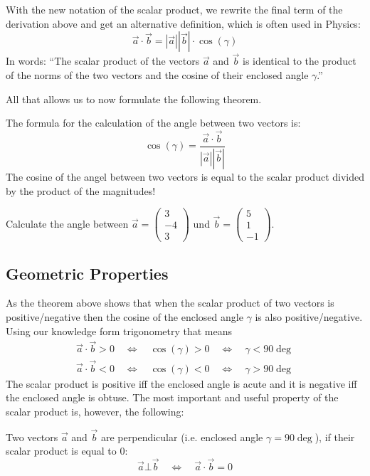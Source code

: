 \documentclass[12pt,eng]{skript_ogg}
\begin{document}
With the new notation of the scalar product, we rewrite the final term of the derivation above and get an alternative definition, which is often used in Physics:
\[\vec{a}\cdot\vec{b}=|\vec{a}||\vec{b}|\cdot\cos(\gamma)\]
In words: ``The scalar product of the vectors $\vec{a}$ and $\vec{b}$ is identical to the product of the norms of the two vectors and the cosine of their enclosed angle $\gamma$.''

All that allows us to now formulate the following theorem.

\begin{satz}
The formula for the calculation of the angle between two vectors is:
\[\cos(\gamma)=\frac{\vec{a}\cdot\vec{b}}{|\vec{a}||\vec{b}|}\]
The cosine of the angel between two vectors is equal to the scalar product divided by the product of the magnitudes!
\end{satz}

\begin{uebung} Calculate the angle between
$\vec{a}=\begin{pmatrix}3\\-4\\3
\end{pmatrix}$ und $\vec{b}=\begin{pmatrix}5\\1\\-1
\end{pmatrix}$.

\vspace{4cm}

\end{uebung}

\subsection{Geometric Properties}
As the theorem above shows that when the scalar product of two vectors is positive/negative then the cosine of the enclosed angle $\gamma$ is also positive/negative. Using our knowledge form trigonometry that means
\[\begin{array}{l}\vec{a}\cdot\vec{b}>0\quad\Leftrightarrow\quad\cos(\gamma)>0\quad\Leftrightarrow\quad\gamma<90\deg\\
\vec{a}\cdot\vec{b}<0\quad\Leftrightarrow\quad\cos(\gamma)<0\quad\Leftrightarrow\quad\gamma>90\deg\end{array}\]
The scalar product is positive iff the enclosed angle is acute and it is negative iff the enclosed angle is obtuse. The most important and useful property of the scalar product is, however, the following:
\begin{wichtig}
Two vectors $\vec{a}$ and $\vec{b}$ are perpendicular (i.e. enclosed angle $\gamma=90\deg$), if their scalar product is equal to 0:
\[\vec{a}\bot\vec{b}\quad\Leftrightarrow\quad\vec{a}\cdot\vec{b}=0\]
\end{wichtig}
\end{document}
